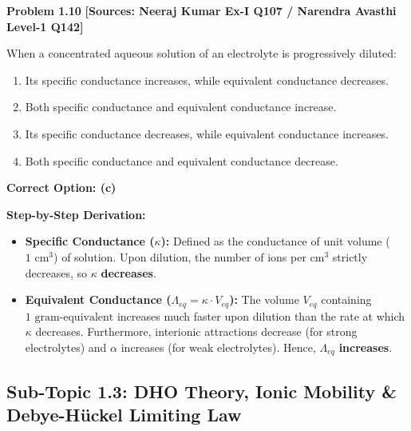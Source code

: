 \begin{problembox}
\textbf{Problem 1.10} \hfill \textbf{[Sources: Neeraj Kumar Ex-I Q107 / Narendra Avasthi Level-1 Q142]}

When a concentrated aqueous solution of an electrolyte is progressively diluted:
\begin{enumerate}[label=(\alph*)]
    \item Its specific conductance increases, while equivalent conductance decreases.
    \item Both specific conductance and equivalent conductance increase.
    \item Its specific conductance decreases, while equivalent conductance increases.
    \item Both specific conductance and equivalent conductance decrease.
\end{enumerate}
\end{problembox}
\begin{solution}
\textbf{Correct Option: (c)}

\textbf{Step-by-Step Derivation:}
\begin{itemize}
    \item \textbf{Specific Conductance ($\kappa$):} Defined as the conductance of unit volume ($1\text{ cm}^3$) of solution. Upon dilution, the number of ions per $\text{cm}^3$ strictly decreases, so $\kappa$ \textbf{decreases}.
    \item \textbf{Equivalent Conductance ($\Lambda_{eq} = \kappa \cdot V_{eq}$):} The volume $V_{eq}$ containing $1\text{ gram-equivalent}$ increases much faster upon dilution than the rate at which $\kappa$ decreases. Furthermore, interionic attractions decrease (for strong electrolytes) and $\alpha$ increases (for weak electrolytes). Hence, $\Lambda_{eq}$ \textbf{increases}.
\end{itemize}
\end{solution}

\subsection{Sub-Topic 1.3: DHO Theory, Ionic Mobility \& Debye-Hückel Limiting Law}

